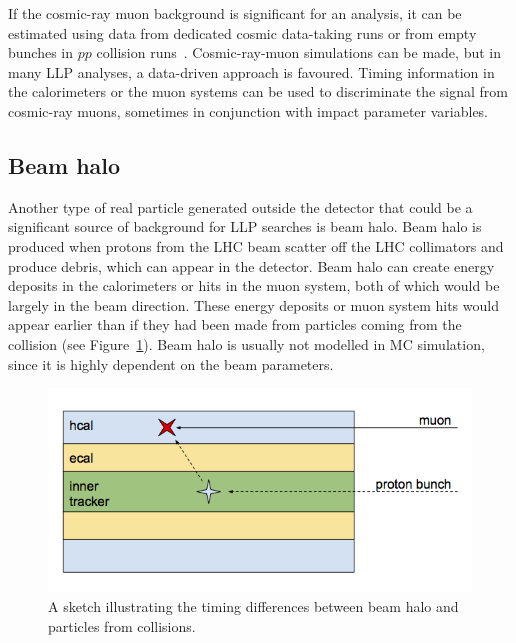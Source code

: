 If the cosmic-ray muon background is significant for an analysis, it can be estimated using data from dedicated cosmic data-taking runs or from empty bunches in $pp$ collision runs~\cite{Khachatryan:2015jha, Chatrchyan:2012dxa, Khachatryan:2010uf}. Cosmic-ray-muon simulations can be made, but in many LLP analyses, a data-driven approach is favoured. Timing information in the calorimeters or the muon systems can be used to discriminate the signal from  cosmic-ray muons, sometimes in conjunction with impact parameter variables.

\subsection{Beam halo} %

Another type of real particle generated outside the detector that could be a significant source of background for LLP searches is beam halo. Beam halo is produced when protons from the LHC beam scatter off the LHC collimators and produce debris, which can appear in the detector. Beam halo can create energy deposits in the calorimeters or hits in the muon system, both of which would be largely in the beam direction. These energy deposits or muon system hits would appear earlier than if they had been made from particles coming from the collision (see Figure~\ref{fig:beamHaloSketch}). Beam halo is usually not modelled in MC simulation, since it is highly dependent on the beam parameters.

\begin{figure}[h]
  \centering
  \includegraphics[width=\textwidth]{figures/beamHaloSketch.png}
  \caption{A sketch illustrating the timing differences between beam halo and particles from collisions.}
  \label{fig:beamHaloSketch}
\end{figure}

